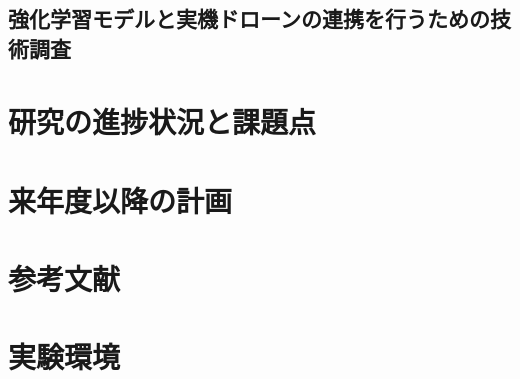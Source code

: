 \documentclass{article}[jsarticle]
\begin{document}
\subsection{強化学習モデルと実機ドローンの連携を行うための技術調査}

\section{研究の進捗状況と課題点}

\section{来年度以降の計画}

\section{参考文献}

\section{実験環境}
\end{document}
